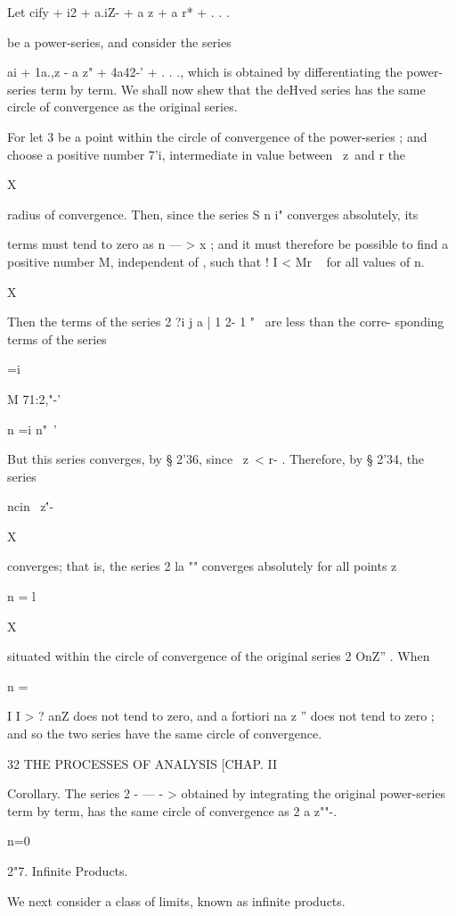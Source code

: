 Let cify + i2 + a.iZ- + a z + a r* + . . .

be a power-series, and consider the series

ai + 1a.,z - a z" + 4a42-' + . . ., which is obtained by
differentiating the power-series term by term. We shall now shew that
the deHved series has the same circle of convergence as the original
series.

For let 3 be a point within the circle of convergence of the
power-series ; and choose a positive number 7'i, intermediate in value
between \ z\ and r the

X

radius of convergence. Then, since the series S n i" converges
absolutely, its

terms must tend to zero as n — > x ; and it must therefore be possible
to find a positive number M, independent of , such that ! I < Mr ~ for
all values of n.

 X

Then the terms of the series 2 ?i j a | 1 2- 1 "~ are less than the
corre- sponding terms of the series



 =i



M 71:2,"-'

n =i n"~'

But this series converges, by § 2'36, since \ z\ < r- . Therefore, by
§ 2'34, the series

 ncin \ z\''-

X

converges; that is, the series 2 la "" converges absolutely for all
points z

n = l

X

situated within the circle of convergence of the original series 2
OnZ'' . When

n =

I I > ? anZ does not tend to zero, and a fortiori na z '' does not
tend to zero ; and so the two series have the same circle of
convergence.



32 THE PROCESSES OF ANALYSIS [CHAP. II

Corollary. The series 2 - — - > obtained by integrating the original
power-series term by term, has the same circle of convergence as 2 a
z""-.

n=0

2"7. Infinite Products.

We next consider a class of limits, known as infinite products.

